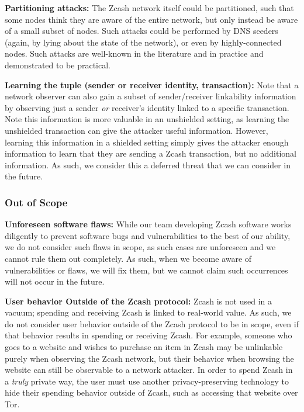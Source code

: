 \documentclass{article}
\begin{document}
\textbf{Partitioning attacks:} The Zcash network itself could be partitioned,
such that some nodes think they are aware of the entire network, but only
instead be aware of a small subset of nodes. Such attacks could be performed by
DNS seeders (again, by lying about the state of the network), or even by
highly-connected nodes. Such attacks are well-known in the literature and in
practice and demonstrated to be practical.

\textbf{Learning the tuple (sender or receiver identity, transaction):}
Note that a network observer can also gain a subset of sender/receiver
linkability information by
observing just a sender \emph{or} receiver's identity linked to a specific
transaction. Note this information is more valuable in an unshielded setting,
as learning the unshielded transaction can give the attacker useful
information. However, learning this information in a shielded setting simply
gives the attacker enough information to learn that they are sending a Zcash
transaction, but no additional information. As such, we consider this a
deferred threat that we can consider in the future.

\subsubsection{Out of Scope}
\label{out-of-scope}

\textbf{Unforeseen software flaws:} While our team developing Zcash software
works diligently to prevent software bugs and vulnerabilities to the best of
our ability, we do not
consider such flaws in scope, as such cases are unforeseen
and we cannot rule them out completely. As such, when we become aware of
vulnerabilities or flaws, we will fix them, but we cannot claim such
occurrences will not occur in the future.

\textbf{User behavior Outside of the Zcash protocol:} Zcash is not used in a
vacuum; spending and receiving Zcash is linked to real-world value. As such, we
do not consider user behavior outside of the Zcash protocol to be in scope,
even if that behavior results in spending or receiving Zcash.
For example, someone who goes to a website and wishes to purchase an item in
Zcash may be unlinkable purely when observing the Zcash network, but their
behavior when browsing the website can still be observable to a network
attacker. In order to spend Zcash in a \emph{truly} private way, the user must
use another privacy-preserving technology to hide their spending behavior
outside of Zcash, such as accessing that website over Tor.
\end{document}
